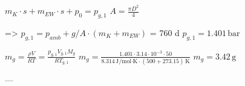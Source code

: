 \( m_K \cdot s + m_{EW} \cdot s + p_0 = p_{g,1} \)  
\( A = \frac{\pi D^2}{4} \)  

=> \( p_{g,1} = p_{amb} + g/A \cdot (m_K + m_{EW}) \) = 760 d  
\( p_{g,1} = 1.401 \, \text{bar} \)  

\( m_g = \frac{\rho V}{RT} = \frac{p_{g,1} V_{g,1} M_g}{R T_{g,1}} \)  
\( m_g = \frac{1.401 \cdot 3.14 \cdot 10^{-3} \cdot 50}{8.314 \, \text{J/mol·K} \cdot (500 + 273.15) \, \text{K}} \)  
\( m_g = 3.42 \, \text{g} \)  

---